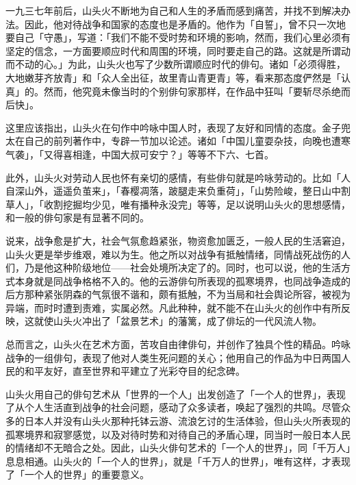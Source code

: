 {    一九三七年前后，山头火不断地为自己和人生的矛盾而感到痛苦，并找不到解决办法。因此，他对待战争和国家的态度也是矛盾的。他作为「自誓」，曾不只一次地要自己「守愚」\footnotemark[14]，写道：「我们不能不受时势和环境的影响，然而，我们心里必须有坚定的信念，一方面要顺应时代和周围的环境，同时要走自己的路。这就是所谓动而不动的心。」\footnotemark[15]为此，山头火也写了少数所谓顺应时代的俳句。诸如「必须得胜，大地嫩芽齐放青」和「众人全出征，故里青山青更青」等，看来那态度俨然是「认真」\footnotemark[16]的。然而，他究竟未像当时的个别俳句家那样，在作品中狂叫「要斩尽杀绝而后快」\footnotemark[17]。


    这里应该指出，山头火在句作中吟咏中国人时，表现了友好和同情的态度。金子兜太在自己的前列著作中，专辟一节加以论述。诸如「中国儿童耍杂技，向晚也遭寒气袭」，「又得喜相逢，中国大叔可安宁？」等等不下六、七首。

    此外，山头火对劳动人民也怀有亲切的感情，有些俳句就是吟咏劳动的。比如「人自深山外，遥遥负茧来」，「春樱凋落，跛腿走来负重荷」，「山势险峻，整日山中割草人」，「收割挖掘均少见，唯有播种永没完」等等，足以说明山头火的思想感情，和一般的俳句家是有显著不同的。

    说来，战争愈是扩大，社会气氛愈趋紧张，物资愈加匮乏，一般人民的生活窘迫，山头火更是举步维艰，难以为生。他之所以对战争有抵触情绪，同情战死战伤的人们，乃是他这种阶级地位——社会处境所决定了的。同时，也可以说，他的生活方式本身就是同战争格格不入的。他的云游俳句所表现的孤寒境界，也同战争造成的后方那种紧张阴森的气氛很不谐和，颇有抵触，不为当局和社会舆论所容，被视为异端，而时时遭到责难，实属必然。凡此种种，就不能不在山头火的创作中有所反映，这就使山头火冲出了「盆景艺术」的藩篱，成了俳坛的一代风流人物。

    总而言之，山头火在艺术方面，苦攻自由律俳句，并创作了独具个性的精品。吟咏战争的一组俳句，表现了他对人类生死问题的关心；他用自己的作品为中日两国人民的和平友好，直至世界和平建立了光彩夺目的纪念碑。

    山头火用自己的俳句艺术从「世界的一个人」出发创造了「一个人的世界」，表现了从个人生活直到战争的社会问题，感动了众多读者，唤起了强烈的共鸣。尽管众多的日本人并没有山头火那种托钵云游、流浪乞讨的生活体验，但山头火所表现的孤寒境界和寂寥感觉，以及对待时势和对待自己的矛盾心理，同当时一般日本人民的情绪却不无暗合之处。因此，山头火俳句艺术的「一个人的世界」，同「千万人」息息相通。山头火的「一个人的世界」，就是「千万人的世界」，唯有这样，才表现了「一个人的世界」的重要意义。

}
